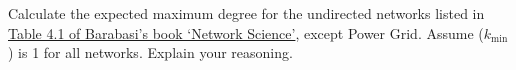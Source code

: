 \documentclass[assignment = 7]{homework}
\begin{document}
    \pagestyle{main}

    Calculate the expected maximum degree for the undirected networks listed in \href{http://networksciencebook.com/chapter/4#scale-free}{Table 4.1 of Barabasi's book `Network Science'}, except Power Grid.  Assume ($k_{\min}$) is 1 for all networks.  Explain your reasoning.

    
\end{document}
